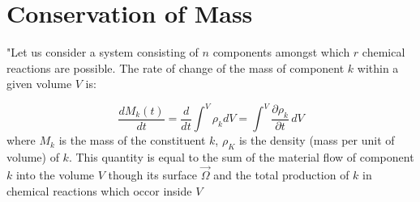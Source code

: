 \section{Conservation of Mass}

"Let us consider a system consisting of $n$ components amongst which $r$ chemical reactions are possible. 
The rate of change of the mass of component $k$ within a given volume $V$ is:

\begin{equation}
\frac{d M_k(t)}{dt} = \frac{d}{dt}\int^V \rho_k dV = \int^V \frac{\partial \rho_k}{\partial t}\, dV
\label{dGM1}
\end{equation}
where $M_k$ is the mass of the constituent $k$, $\rho_K$ is the density (mass per unit of volume) of $k$. This quantity is equal to the sum of the material flow of component $k$ into the volume $V$ though its surface $\vec{\Omega}$ and the total production of $k$ in chemical reactions which occor inside $V$

